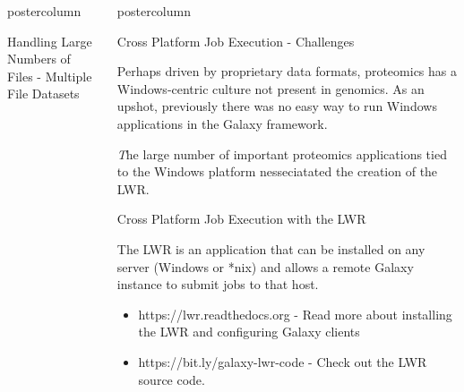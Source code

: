 \documentclass[final]{beamer}
\newlength{\columnheight}
\begin{document}
\begin{frame}
\begin{columns}
\begin{column}{.67\textwidth}
\begin{beamercolorbox}[center,wd=\textwidth]{postercolumn}
\begin{minipage}[T]{.98\textwidth}
{\begin{block}{Handling Large Numbers of Files - Multiple File Datasets}
\begin{columns}
                \end{columns}
              \end{block}
            }
          \end{minipage}
        \end{beamercolorbox}
      \end{column}              

      \begin{column}{.33\textwidth}
        \begin{beamercolorbox}[center,wd=\textwidth]{postercolumn}
          \begin{minipage}[T]{.98\textwidth} %
            \parbox[t][\columnheight]{\textwidth}{
              \begin{block}{Cross Platform Job Execution - Challenges}

              Perhaps driven by proprietary data formats, proteomics has a
              Windows-centric culture not present in genomics. As an upshot,
              previously there was no easy way to run Windows applications in
              the Galaxy framework.

              {\large\textsl
              The large number of important proteomics applications tied to the
              Windows platform nesseciatated the creation of the LWR.}


              \end{block}
              \vfill
              \begin{block}{Cross Platform Job Execution with the LWR}

              The LWR is an application that can be installed on any server
              (Windows or *nix) and allows a remote Galaxy instance to submit
              jobs to that host.

              \begin{itemize}
              \item https://lwr.readthedocs.org - Read more about installing the LWR and configuring Galaxy clients 
              \item https://bit.ly/galaxy-lwr-code - Check out the LWR source code.
              \end{itemize}


\end{block}}
\end{minipage}
\end{beamercolorbox}
\end{column}
\end{columns}
\end{frame}
\end{document}
